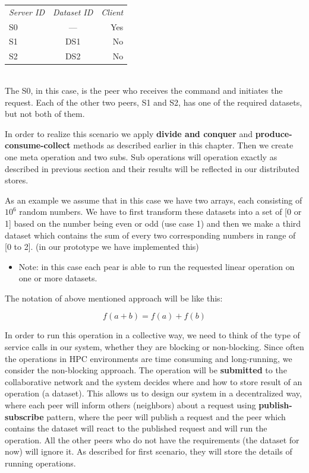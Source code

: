 \begin{tabular}{ l c r }
\em{Server ID} & \em{ Dataset ID} & \em{ Client} \\
S0 & --- & Yes \\
S1 & DS1 & No \\
S2 & DS2 & No \\
\end{tabular}\\

The S0, in this case, is the peer who receives the command and initiates the request. 
Each of the other two peers, S1 and S2, has one of the required datasets, but not both of them. 

In order to realize this scenario we apply \textbf{divide and conquer} and \textbf{produce-consume-collect} methods
as described earlier in this chapter. Then we create one meta operation and two subs. Sub operations will operation exactly as described in previous section
and their results will be reflected in our distributed stores.

As an example we assume that in this case we have two arrays, each consisting of \(10^6\) random numbers. 
We have to first transform these datasets into a set of [0 or 1] based on the number being even or odd (use case 1) 
and then we make a third dataset which contains the sum of every two corresponding numbers in range of [0 to 2].
(in our prototype we have implemented this)

\begin{itemize}
\item Note: in this case each pear is able to run the requested linear operation on one or more datasets.
\end{itemize}

The notation of above mentioned approach will be like this:

\[ f(a + b) = f(a) + f(b) \]

In order to run this operation in a collective way, 
we need to think of the type of service calls in our system, 
whether they are blocking or non-blocking. 
Since often the operations in HPC environments are time consuming and long-running, 
we consider the non-blocking approach. 
The operation will be \textbf{submitted} to the collaborative network and
the system decides where and how to store result of an operation (a dataset).
This allows us to design our system in a decentralized way, 
where each peer will inform others (neighbors) about a request using \textbf{publish-subscribe} pattern, 
where the peer will publish a request and the peer which contains 
the dataset will react to the published request and will run the operation. 
All the other peers who do not have the requirements (the dataset for now) will ignore it.
As described for first scenario, 
they will store the details of running operations.


